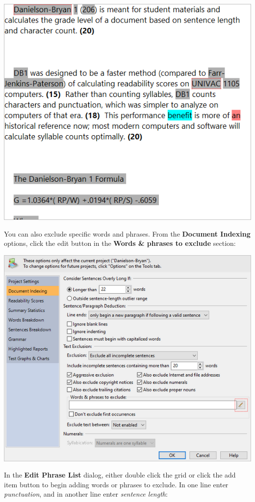 \documentclass[
]{book}
\theoremstyle{definition}
\theoremstyle{definition}
\theoremstyle{definition}
\theoremstyle{definition}
\theoremstyle{remark}
\begin{document}
\begin{center}\includegraphics[width=0.75\linewidth,]{Images/ExclusionExampleProperExcludedNow} \end{center}

You can also exclude specific words and phrases. From the \textbf{Document Indexing} options, click the edit button in the \textbf{Words \& phrases to exclude} section:

\includegraphics{Images/ExclusionExampleEditListButton.png}

In the \textbf{Edit Phrase List} dialog, either double click the grid or click the add item button to begin adding words or phrases to exclude. In one line enter \emph{punctuation}, and in another line enter \emph{sentence length}:
\end{document}
